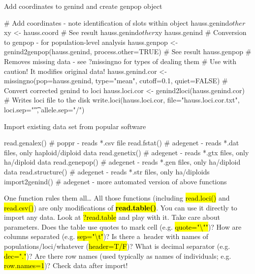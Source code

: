 \documentclass[compress, ucs, xelatex, 11pt, xcolor=svgnames,
  hyperref={
    bookmarks=true,
    unicode=true,
    colorlinks=true,
    pdftitle={Molecular data in R},
    plainpages=false,
    pdfauthor={Vojtech Zeisek},
    pdfsubject={Course about phylogeny and evolution in R},
    pdfcreator={XeLaTeX},
    pdfkeywords={R, evolution, phylogeny, molecular data},
    linkcolor=Tomato,
    anchorcolor=SaddleBrown,
    citecolor=Goldenrod,
    filecolor=DarkMagenta,
    menucolor=Sienna,
    urlcolor=DarkTurquoise,
    pdftex},
  url={hyphens, lowtilde} %
  ]{beamer}
\renewcommand{\texttt}[1]{\hl{\ttfamily #1}}
\begin{document}
\begin{frame}[fragile]{Add coordinates to genind and create genpop object}
  \begin{spluscode}
    # Add coordinates - note identification of slots within object
    hauss.genind$other$xy <- hauss.coord
    # See result
    hauss.genind$other$xy
    hauss.genind
    # Conversion to genpop - for population-level analysis
    hauss.genpop <- genind2genpop(hauss.genind, process.other=TRUE)
    # See result
    hauss.genpop
    # Removes missing data - see ?missingno for types of dealing them
    # Use with caution! It modifies original data!
    hauss.genind.cor <- missingno(pop=hauss.genind, type="mean", cutoff=0.1,
      quiet=FALSE)
    # Convert corrected genind to loci
    hauss.loci.cor <- genind2loci(hauss.genind.cor)
    # Writes loci file to the disk
    write.loci(hauss.loci.cor, file="hauss.loci.cor.txt",
      loci.sep="\t", allele.sep="/")
  \end{spluscode}
\end{frame}

\begin{frame}[fragile]{Import existing data set from popular software}
  \begin{spluscode}
    read.genalex() # poppr - reads *.csv file
    read.fstat() # adegenet - reads *.dat files, only haploid/diploid data
    read.genetix() # adegenet - reads *.gtx files, only ha/diploid data
    read.genepop() # adegenet - reads *.gen files, only ha/diploid data
    read.structure() # adegenet - reads *.str files, only ha/diploids
    import2genind() # adegenet - more automated version of above functions
  \end{spluscode}
\begin{block}{One function rules them all\ldots}
  All those functions (including \texttt{read.loci()} and \texttt{read.csv()}) are only modifications of \textbf{\texttt{read.table()}}. You can use it directly to import any data. Look at \texttt{?read.table} and play with it. Take care about parameters. Does the table use quotes to mark cell (e.g. \texttt{quote="\textbackslash ""})? How are columns separated (e.g. \texttt{sep="\textbackslash t"})? Is there a~header with names of populations/loci/whatever (\texttt{header=T/F})? What is decimal separator (e.g. \texttt{dec="."})? Are there row names (used typically as names of individuals; e.g. \texttt{row.names=1})? \alert{Check data after import!}
\end{block}
\end{frame}
\end{document}
